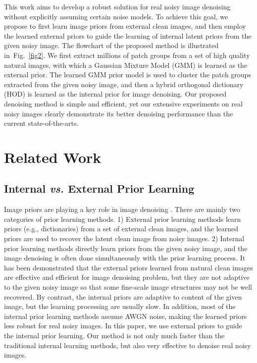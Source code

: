 \documentclass[10pt,twocolumn,letterpaper]{article}
\begin{document}
This work aims to develop a robust solution for real noisy image denoising without explicitly assuming certain noise models. To achieve this goal, we propose to first learn image priors from external clean images, and then employ the learned external priors to guide the learning of internal latent priors from the given noisy image. The flowchart of the proposed method is illustrated in\ Fig.\ \ref{fig2}. We first extract millions of patch groups from a set of high quality natural images, with which a Gaussian Mixture Model (GMM) is learned as the external prior. The learned GMM prior model is used to cluster the patch groups extracted from the given noisy image, and then a hybrid orthogonal dictionary (HOD) is learned as the internal prior for image denoising. Our proposed denoising method is simple and efficient, yet our extensive experiments on real noisy images clearly demonstrate its better denoising performance than the current state-of-the-arts.

\section{Related Work}

\subsection{Internal \textbf{\emph{vs.}} External Prior Learning}

Image priors are playing a key role in image denoising \cite{pgpd,epll,ksvd,ple,ncsr,iraniinternal}. There are mainly two categories of prior learning methods. 1) External prior learning methods \cite{foe,pgpd,epll} learn priors (e.g., dictionaries) from a set of external clean images, and the learned priors are used to recover the latent clean image from noisy images. 2) Internal prior learning methods \cite{ksvd,ncsr,ple,iraniinternal} directly learn priors from the given noisy image, and the image denoising is often done simultaneously with the prior learning process. It has been demonstrated \cite{pgpd,epll} that the external priors learned from natural clean images are effective and efficient for image denoising problem, but they are not adaptive to the given noisy image so that some fine-scale image structures may not be well recovered. By contrast, the internal priors are adaptive to content of the given image, but the learning processing are usually slow. In addition, most of the internal prior learning methods \cite{ksvd,ncsr,ple,iraniinternal} assume AWGN noise, making the learned priors less robust for real noisy images. 
In this paper, we use external priors to guide the internal prior learning. Our method is not only much faster than the traditional internal learning methods, but also very effective to denoise real noisy images.
\end{document}
